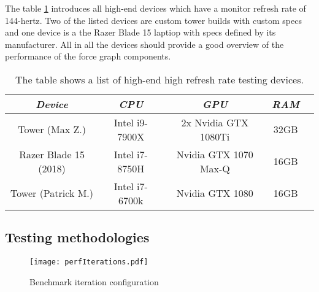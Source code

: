 The table \ref{tab:highendTestingDevices} introduces all high-end devices which have a monitor refresh rate of 144-hertz. Two of the listed devices are custom tower builds with custom specs and one device is a the Razer Blade 15 laptiop with specs defined by its manufacturer. All in all the devices should provide a good overview of the performance of the force graph components.

\begin{table}
  \centering
  \begin{threeparttable}
    \caption{The table shows a list of high-end high refresh rate testing devices.}
    \label{tab:highendTestingDevices}
    \centering
    \def\rr{\rightskip=0pt plus1em \spaceskip=.3333em \xspaceskip=.5em\relax}
    \setlength{\tabcolsep}{1ex}
    \def\arraystretch{1.20}
    \setlength{\tabcolsep}{1ex}
    \small
    \begin{english}
      \begin{tabular}{|c||c|c|c|c|}
        \hline
          \multicolumn{1}{|c||}{\emph{Device}}&
          \multicolumn{1}{|c}{\emph{CPU}} &
          \multicolumn{1}{|c}{\emph{GPU}} &
          \multicolumn{1}{|c|}{\emph{RAM}} \\
        \hline
        \hline
        Tower (Max Z.) & 
        Intel i9-7900X & 
        2x Nvidia GTX 1080Ti & 
        32GB \\
        \hline
        Razer Blade 15 (2018) & 
        Intel i7-8750H & 
        Nvidia GTX 1070 Max-Q  & 
        16GB \\
        \hline
        Tower (Patrick M.) &
        Intel i7-6700k & 
        Nvidia GTX 1080 & 
        16GB \\
        \hline
      \end{tabular}  
    \end{english}
  \end{threeparttable}
\end{table}

\subsection{Testing methodologies}

\begin{figure}
\centering
\texttt{[image: perfIterations.pdf]}
\caption{Benchmark iteration configuration}
\label{fig:perfIterations}
\end{figure}

